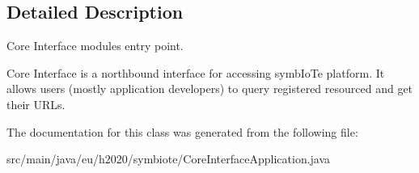 \subsection{Detailed Description}
Core Interface module\textquotesingle{}s entry point. 

Core Interface is a northbound interface for accessing symb\+Io\+Te platform. It allows users (mostly application developers) to query registered resourced and get their U\+R\+Ls. 

The documentation for this class was generated from the following file\+:\begin{DoxyCompactItemize}
\item 
src/main/java/eu/h2020/symbiote/Core\+Interface\+Application.\+java\end{DoxyCompactItemize}
